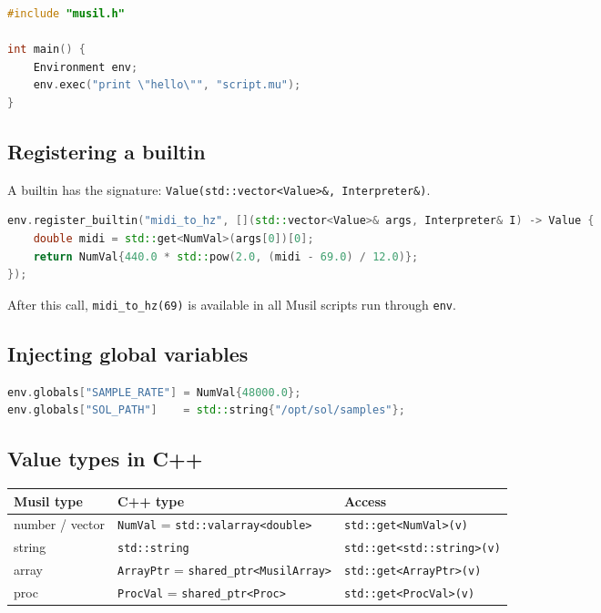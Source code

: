\documentclass[11pt,a4paper]{article}
\newcommand{\musil}[1]{\lstinline[style=musilinline]{#1}}
\begin{document}
\begin{lstlisting}[language=C++]
#include "musil.h"

int main() {
    Environment env;
    env.exec("print \"hello\"", "script.mu");
}
\end{lstlisting}

\subsection{Registering a builtin}

A builtin has the signature:
\texttt{Value(std::vector<Value>\&, Interpreter\&)}.

\begin{lstlisting}[language=C++]
env.register_builtin("midi_to_hz", [](std::vector<Value>& args, Interpreter& I) -> Value {
    double midi = std::get<NumVal>(args[0])[0];
    return NumVal{440.0 * std::pow(2.0, (midi - 69.0) / 12.0)};
});
\end{lstlisting}

After this call, \musil{midi_to_hz(69)} is available in all Musil scripts run
through \texttt{env}.

\subsection{Injecting global variables}

\begin{lstlisting}[language=C++]
env.globals["SAMPLE_RATE"] = NumVal{48000.0};
env.globals["SOL_PATH"]    = std::string{"/opt/sol/samples"};
\end{lstlisting}

\subsection{Value types in C++}

\begin{center}
\begin{tabular}{@{}lll@{}}
\toprule
\textbf{Musil type} & \textbf{C++ type} & \textbf{Access} \\
\midrule
number / vector  & \texttt{NumVal} = \texttt{std::valarray<double>} & \texttt{std::get<NumVal>(v)} \\
string           & \texttt{std::string}                              & \texttt{std::get<std::string>(v)} \\
array            & \texttt{ArrayPtr} = \texttt{shared\_ptr<MusilArray>} & \texttt{std::get<ArrayPtr>(v)} \\
proc             & \texttt{ProcVal} = \texttt{shared\_ptr<Proc>}    & \texttt{std::get<ProcVal>(v)} \\
\bottomrule
\end{tabular}
\end{center}
\end{document}
